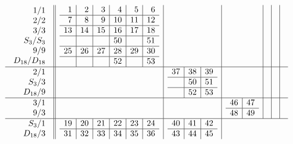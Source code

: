 \documentclass[12pt,a4paper]{amsart}
\begin{document}
\begin{align*}
  \begin{array}{r||c|c|c|c|c|c}
  \begin{array}{r}
1/1\\2/2\\3/3\\S_3/S_3\\9/9\\D_{18}/D_{18}\\
  \end{array}
   &
\begin{array}{r|r|r|r|r|r}
1&2&3&4&5&6\\ \hline
7&8&9&10&11&12\\ \hline
13&14&15&16&17&18\\ \hline
&&&50&&51\\ \hline
25&26&27&28&29&30\\ \hline
&&&52&&53
\end{array}
&&&&& \\ \hline
    \begin{array}{r}
2/1\\S_3/3\\D_{18}/9\\
    \end{array}
    &&
\begin{array}{r|r|r}%
37&38&39\\ \hline
&50&51\\ \hline
&52&53
\end{array}
&&&& \\ \hline
    \begin{array}{r}
3/1\\9/3\\
    \end{array}
    &&&
\begin{array}{r|r}%
46&47\\ \hline
48&49
\end{array}%
&&& \\ \hline
    \begin{array}{r}
S_3/1\\D_{18}/3
    \end{array}
    &
\begin{array}{r|r|r|r|r|r}
19&20&21&22&23&24\\ \hline
31&32&33&34&35&36
\end{array}
&
\begin{array}{r|r|r}%
40&41&42\\ \hline
43&44&45
\end{array}

\end{array}
\end{align*}
\end{document}

